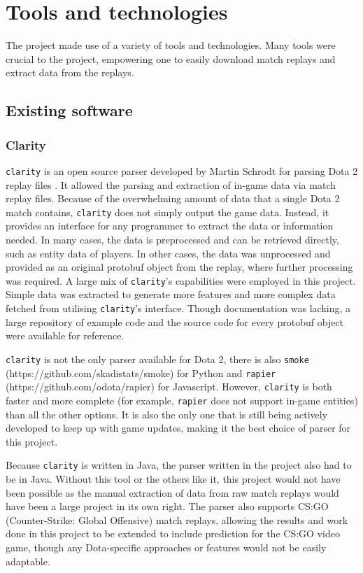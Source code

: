 \documentclass[Report.tex]{subfiles}
\begin{document}
\section{Tools and technologies}
The project made use of a variety of tools and technologies. Many tools were crucial to the project, empowering one to easily download match replays and extract data from the replays.

\subsection{Existing software}

\subsubsection{Clarity}
\texttt{clarity} is an open source parser developed by Martin Schrodt for parsing Dota 2 replay files \cite{clarity}. It allowed the parsing and extraction of in-game data via match replay files. Because of the overwhelming amount of data that a single Dota 2 match contains, \texttt{clarity} does not simply output the game data. Instead, it provides an interface for any programmer to extract the data or information needed. In many cases, the data is preprocessed and can be retrieved directly, such as entity data of players. In other cases, the data was unprocessed and provided as an original protobuf object from the replay, where further processing was required. A large mix of \texttt{clarity}'s capabilities were employed in this project. Simple data was extracted to generate more features and more complex data fetched from utilising \texttt{clarity}'s interface. Though documentation was lacking, a large repository of example code and the source code for every protobuf object were available for reference. 

\texttt{clarity} is not the only parser available for Dota 2, there is also \texttt{smoke} (https://github.com/skadistats/smoke) for Python and \texttt{rapier} (https://github.com/odota/rapier) for Javascript. However, \texttt{clarity} is both faster and more complete (for example, \texttt{rapier} does not support in-game entities) than all the other options. It is also the only one that is still being actively developed to keep up with game updates, making it the best choice of parser for this project. 

Because \texttt{clarity} is written in Java, the parser written in the project also had to be in Java. Without this tool or the others like it, this project would not have been possible as the manual extraction of data from raw match replays would have been a large project in its own right. The parser also supports CS:GO (Counter-Strike: Global Offensive) match replays, allowing the results and work done in this project to be extended to include prediction for the CS:GO video game, though any Dota-specific approaches or features would not be easily adaptable. 
\end{document}

